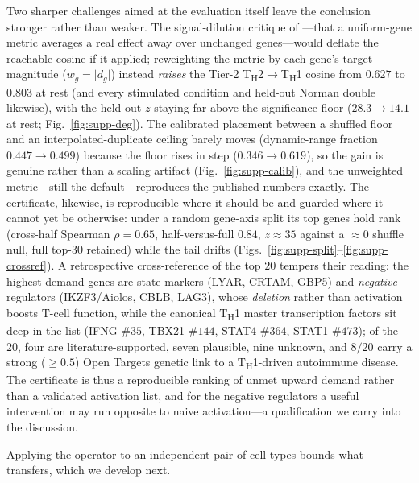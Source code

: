 Two sharper challenges aimed at the evaluation itself leave the conclusion stronger rather than
weaker. The signal-dilution critique of \citet{Mejia2025}---that a uniform-gene metric averages
a real effect away over unchanged genes---would deflate the reachable cosine if it applied;
reweighting the metric by each gene's target magnitude ($w_g=\lvert d_g\rvert$) instead
\emph{raises} the Tier-2 T\textsubscript{H}2$\rightarrow$T\textsubscript{H}1 cosine from $0.627$
to $0.803$ at rest (and every stimulated condition and held-out Norman double likewise), with
the held-out $z$ staying far above the significance floor ($28.3\rightarrow14.1$ at rest;
Fig.~\ref{fig:supp-deg}). The calibrated placement between a shuffled floor and an
interpolated-duplicate ceiling barely moves (dynamic-range fraction $0.447\rightarrow0.499$)
because the floor rises in step ($0.346\rightarrow0.619$), so the gain is genuine rather than a
scaling artifact (Fig.~\ref{fig:supp-calib}), and the unweighted metric---still the
default---reproduces the published numbers exactly. The certificate, likewise, is reproducible
where it should be and guarded where it cannot yet be otherwise: under a random gene-axis split
its top genes hold rank (cross-half Spearman $\rho=0.65$, half-versus-full $0.84$, $z\approx35$
against a $\approx0$ shuffle null, full top-$30$ retained) while the tail drifts
(Figs.~\ref{fig:supp-split}--\ref{fig:supp-crossref}). A retrospective cross-reference of the
top $20$ tempers their reading: the highest-demand genes are state-markers (LYAR, CRTAM, GBP5)
and \emph{negative} regulators (IKZF3/Aiolos, CBLB, LAG3), whose \emph{deletion} rather than
activation boosts T-cell function, while the canonical T\textsubscript{H}1 master transcription
factors sit deep in the list (IFNG $\#35$, TBX21 $\#144$, STAT4 $\#364$, STAT1 $\#473$); of the
$20$, four are literature-supported, seven plausible, nine unknown, and $8/20$ carry a strong
($\ge0.5$) Open Targets genetic link to a T\textsubscript{H}1-driven autoimmune disease. The
certificate is thus a reproducible ranking of unmet upward demand rather than a validated
activation list, and for the negative regulators a useful intervention may run opposite to
naive activation---a qualification we carry into the discussion.

Applying the operator to an independent pair of cell types bounds what transfers, which we
develop next.

